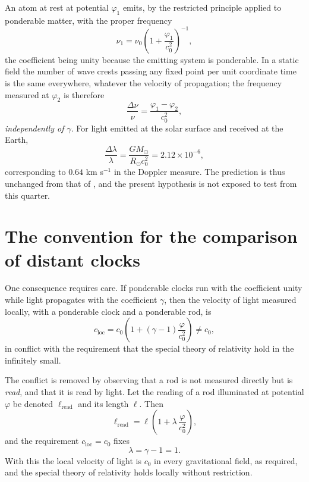 \documentclass[aps,prd,reprint,amsmath,amssymb,nofootinbib,longbibliography]{revtex4-2}
\begin{document}
An atom at rest at potential $\varphi_1$ emits, by the restricted principle applied to ponderable
matter, with the proper frequency
\begin{equation}
\nu_1 = \nu_0 \left( 1 + \frac{\varphi_1}{c_0^{2}} \right)^{-1} ,
\end{equation}
the coefficient being unity because the emitting system is ponderable. In a static field the number
of wave crests passing any fixed point per unit coordinate time is the same everywhere, whatever the
velocity of propagation; the frequency measured at $\varphi_2$ is therefore
\begin{equation}
\frac{\Delta \nu}{\nu} = \frac{\varphi_1 - \varphi_2}{c_0^{2}} ,
\label{eq:redshift}
\end{equation}
\emph{independently of $\gamma$}. For light emitted at the solar surface and received at the Earth,
\begin{equation}
\frac{\Delta \lambda}{\lambda} = \frac{GM_\odot}{R_\odot c_0^{2}} = 2.12 \times 10^{-6} ,
\end{equation}
corresponding to $0.64$ km s$^{-1}$ in the Doppler measure. The prediction is thus unchanged from
that of \cite{ein1907}, and the present hypothesis is not exposed to test from this quarter.

\section{The convention for the comparison of distant clocks}
\label{sec:rods}

One consequence requires care. If ponderable clocks run with the coefficient unity while light
propagates with the coefficient $\gamma$, then the velocity of light measured locally, with a
ponderable clock and a ponderable rod, is
\begin{equation}
c_{\text{loc}} = c_0 \left( 1 + (\gamma - 1)\frac{\varphi}{c_0^{2}} \right) \neq c_0 ,
\end{equation}
in conflict with the requirement that the special theory of relativity hold in the infinitely small.

The conflict is removed by observing that a rod is not measured directly but is \emph{read}, and
that it is read by light. Let the reading of a rod illuminated at potential $\varphi$ be denoted
$\ell_{\text{read}}$ and its length $\ell$. Then
\begin{equation}
\ell_{\text{read}} = \ell \left( 1 + \lambda\,\frac{\varphi}{c_0^{2}} \right) ,
\label{eq:rod}
\end{equation}
and the requirement $c_{\text{loc}} = c_0$ fixes
\begin{equation}
\lambda = \gamma - 1 = 1 .
\end{equation}
With this the local velocity of light is $c_0$ in every gravitational field, as required, and the
special theory of relativity holds locally without restriction.
\end{document}
